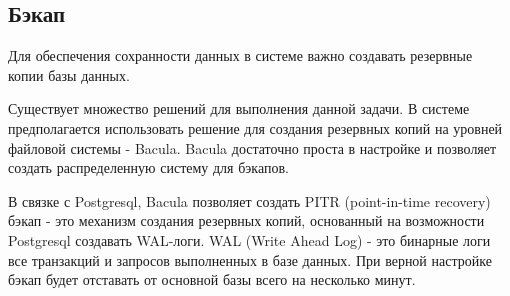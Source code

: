 \subsection{Бэкап}
Для обеспечения сохранности данных в системе важно создавать резервные копии
базы данных.

Существует множество решений для выполнения данной задачи. В системе
предполагается использовать решение для создания резервных копий на уровней
файловой системы - Bacula. Bacula достаточно проста в настройке и позволяет
создать распределенную систему для бэкапов.

В связке с Postgresql, Bacula позволяет создать PITR (point-in-time recovery)
бэкап - это механизм создания резервных копий, основанный на возможности
Postgresql создавать WAL-логи. WAL (Write Ahead Log) - это бинарные логи все
транзакций и запросов выполненных в базе данных. При верной настройке бэкап
будет отставать от основной базы всего на несколько минут.